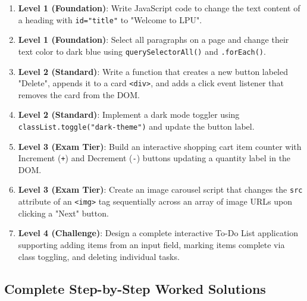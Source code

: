 \begin{practiceset}
\begin{enumerate}[leftmargin=1.5em]
    \item \textbf{Level 1 (Foundation)}: Write JavaScript code to change the text content of a heading with \texttt{id="title"} to "Welcome to LPU".
    \item \textbf{Level 1 (Foundation)}: Select all paragraphs on a page and change their text color to dark blue using \texttt{querySelectorAll()} and \texttt{.forEach()}.
    \item \textbf{Level 2 (Standard)}: Write a function that creates a new button labeled "Delete", appends it to a card \texttt{<div>}, and adds a click event listener that removes the card from the DOM.
    \item \textbf{Level 2 (Standard)}: Implement a dark mode toggler using \texttt{classList.toggle("dark-theme")} and update the button label.
    \item \textbf{Level 3 (Exam Tier)}: Build an interactive shopping cart item counter with Increment (\texttt{+}) and Decrement (\texttt{-}) buttons updating a quantity label in the DOM.
    \item \textbf{Level 3 (Exam Tier)}: Create an image carousel script that changes the \texttt{src} attribute of an \texttt{<img>} tag sequentially across an array of image URLs upon clicking a "Next" button.
    \item \textbf{Level 4 (Challenge)}: Design a complete interactive To-Do List application supporting adding items from an input field, marking items complete via class toggling, and deleting individual tasks.
\end{enumerate}
\end{practiceset}

\subsection{Complete Step-by-Step Worked Solutions}

